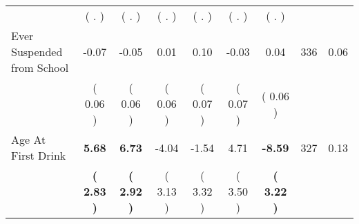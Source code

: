 \begin{tabular}{lcccccccc}
 & (        . ) & (        . ) & (        . ) & (        . ) & (        . ) & (        . ) & \\
Ever Suspended from School &     -0.07 &     -0.05 &      0.01 &      0.10 &     -0.03 &      0.04 & 336 &       0.06 \\ 
 & (     0.06 ) & (     0.06 ) & (     0.06 ) & (     0.07 ) & (     0.07 ) & (     0.06 ) & \\
Age At First Drink & \textbf{     5.68} & \textbf{     6.73} &     -4.04 &     -1.54 &      4.71 & \textbf{    -8.59} & 327 &       0.13 \\ 
 & \textbf{(     2.83 )} & \textbf{(     2.92 )} & (     3.13 ) & (     3.32 ) & (     3.50 ) & \textbf{(     3.22 )} & \\
\bottomrule
\end{tabular}
